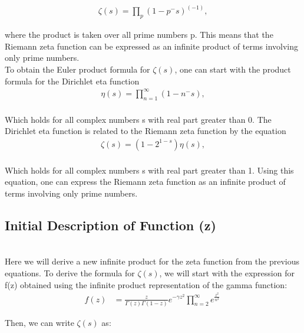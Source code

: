 \documentclass{article}
\begin{document}
\begin{align*}
\zeta(s) = \prod_{p} \left(1 - p^-s\right)^\left(-1\right),
\end{align*}

where the product is taken over all prime numbers p. This means that the Riemann zeta function can be expressed as an infinite product of terms involving only prime numbers. \\

To obtain the Euler product formula for $\zeta\left(s\right)$, one can start with the product formula for the Dirichlet eta function \\

\begin{align*}
\eta(s) = \prod_{n=1}^\infty \left(1 - n^-s\right), \\
\end{align*}

Which holds for all complex numbers s with real part greater than 0. The Dirichlet eta function is related to the Riemann zeta function by the equation \\

\begin{align*}
\zeta(s) = \left(1 - 2^{1-s}\right) \eta\left(s\right), \\
\end{align*}

Which holds for all complex numbers s with real part greater than 1. Using this equation, one can express the Riemann zeta function as an infinite product of terms involving only prime numbers. \\

\subsection*{Initial Description of Function \zeta(z)} \\
Here we will derive a new infinite product for the zeta function from the previous equations. To derive the formula for $\zeta(s)$, we will start with the expression for f(z) obtained using the infinite product representation of the gamma function: \\

\begin{align*}
f(z) &= \frac{z}{\Gamma(z)\Gamma(1-z)}e^{-\gamma z^2} \prod_{n=2}^{\infty} e^{\frac{z^2}{n^2}} \
\end{align*}

Then, we can write $\zeta(s)$ as:
\end{document}
